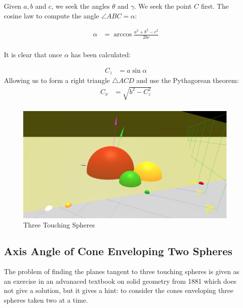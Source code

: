 \documentclass{article}
\begin{document}
Given $a,b$ and $c$, we seek the angles $\theta$ and $\gamma$.
We seek the  point $C$ first.
The cosine law to compute the angle $\angle ABC = \alpha$:

\begin{align}
  \alpha  &= \arccos{\frac{a^2 + b^2 - c^2}{2bc}} \\
\end{align}

It is clear that once $\alpha$ has been calculated:

\begin{align}
 C_z  &= a\sin{\alpha}
\end{align}
Allowing us to form a right triangle $\triangle ACD$ and use the Pythagorean theorem:
\begin{align}
  C_x   &= \sqrt{b^2 - C_z^2}  \\
\end{align}



\begin{figure}
     \centering
     \includegraphics[width=0.99\textwidth]{figures/StandardThreeSphereDiagram.png}
     \caption{Three Touching Spheres}
  \label{fig:fixed}
\end{figure}


\subsection{Axis Angle of Cone Enveloping Two Spheres}

The problem of finding the planes tangent to three touching spheres
is given as an exercise in an advanaced textbook on solid geometry from 1881\cite{payne1881} which does not give a solution,
but it gives a hint: to consider the cones enveloping
three spheres taken two at a time.
\end{document}
